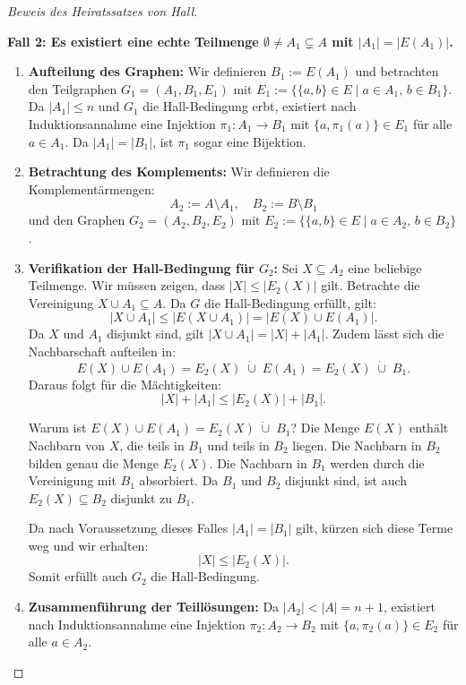 \begin{proof}[Beweis des Heiratssatzes von Hall]
\begin{math-stroke}
\textbf{Fall 2: Es existiert eine echte Teilmenge $\emptyset \neq A_1 \subsetneq A$ mit $|A_1| = |E(A_1)|$.}
\begin{enumerate}[label=\textbf{(\arabic*)}]
    \item \textbf{Aufteilung des Graphen:} Wir definieren $B_1 := E(A_1)$ und betrachten den Teilgraphen $G_1 = (A_1, B_1, E_1)$ mit $E_1 := \bigl\{ \{a, b\} \in E \;\big|\; a \in A_1, \, b \in B_1 \bigr\}$. Da $|A_1| \le n$ und $G_1$ die Hall-Bedingung erbt, existiert nach Induktionsannahme eine Injektion $\pi_1 \colon A_1 \to B_1$ mit $\{a, \pi_1(a)\} \in E_1$ für alle $a \in A_1$. Da $|A_1| = |B_1|$, ist $\pi_1$ sogar eine Bijektion.
    \item \textbf{Betrachtung des Komplements:} Wir definieren die Komplementärmengen:
    \[
    A_2 := A \setminus A_1, \quad B_2 := B \setminus B_1
    \]
    und den Graphen $G_2 = (A_2, B_2, E_2)$ mit $E_2 := \bigl\{ \{a, b\} \in E \;\big|\; a \in A_2, \, b \in B_2 \bigr\}$.
    \item \textbf{Verifikation der Hall-Bedingung für $G_2$:} Sei $X \subseteq A_2$ eine beliebige Teilmenge. Wir müssen zeigen, dass $|X| \le |E_2(X)|$ gilt.
    Betrachte die Vereinigung $X \cup A_1 \subseteq A$. Da $G$ die Hall-Bedingung erfüllt, gilt:
    \[
    |X \cup A_1| \le |E(X \cup A_1)| = |E(X) \cup E(A_1)|.
    \]
    Da $X$ und $A_1$ disjunkt sind, gilt $|X \cup A_1| = |X| + |A_1|$. Zudem lässt sich die Nachbarschaft aufteilen in:
    \[
    E(X) \cup E(A_1) = E_2(X) \;\dot{\cup}\; E(A_1) = E_2(X) \;\dot{\cup}\; B_1.
    \]
    Daraus folgt für die Mächtigkeiten:
    \[
    |X| + |A_1| \le |E_2(X)| + |B_1|.
    \]
    \begin{explanation-of-steps}
    Warum ist $E(X) \cup E(A_1) = E_2(X) \;\dot{\cup}\; B_1$? Die Menge $E(X)$ enthält Nachbarn von $X$, die teils in $B_1$ und teils in $B_2$ liegen. Die Nachbarn in $B_2$ bilden genau die Menge $E_2(X)$. Die Nachbarn in $B_1$ werden durch die Vereinigung mit $B_1$ absorbiert. Da $B_1$ und $B_2$ disjunkt sind, ist auch $E_2(X) \subseteq B_2$ disjunkt zu $B_1$.
    \end{explanation-of-steps}
    Da nach Voraussetzung dieses Falles $|A_1| = |B_1|$ gilt, kürzen sich diese Terme weg und wir erhalten:
    \[
    |X| \le |E_2(X)|.
    \]
    Somit erfüllt auch $G_2$ die Hall-Bedingung.
    \item \textbf{Zusammenführung der Teillösungen:} Da $|A_2| < |A| = n+1$, existiert nach Induktionsannahme eine Injektion $\pi_2 \colon A_2 \to B_2$ mit $\{a, \pi_2(a)\} \in E_2$ für alle $a \in A_2$.

\end{enumerate}
\end{math-stroke}
\end{proof}
